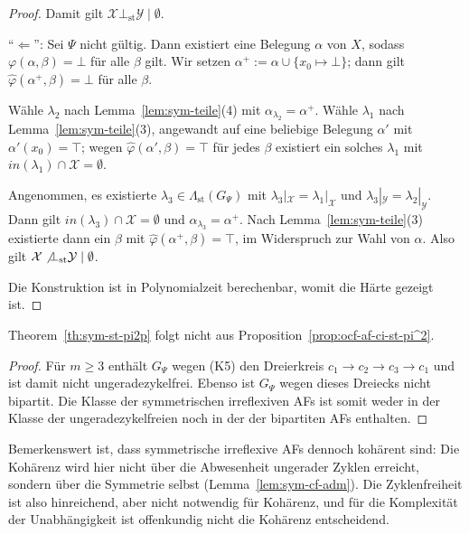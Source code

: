 \begin{proof}
    Damit gilt \(\mathcal{X}\bot_{\mathrm{st}}\mathcal{Y}\mid\emptyset\).

    \enquote{\(\Leftarrow\)}: Sei \(\Psi\) nicht gültig. Dann existiert eine
    Belegung \(\alpha\) von \(X\), sodass \(\varphi(\alpha,\beta)=\bot\) für
    alle \(\beta\) gilt. Wir setzen
    \(\alpha^{+}:=\alpha\cup\{x_0\mapsto\bot\}\); dann gilt
    \(\widehat{\varphi}(\alpha^{+},\beta)=\bot\) für alle \(\beta\).

    Wähle \(\lambda_2\) nach Lemma~\ref{lem:sym-teile}(4) mit
    \(\alpha_{\lambda_2}=\alpha^{+}\). Wähle \(\lambda_1\) nach
    Lemma~\ref{lem:sym-teile}(3), angewandt auf eine beliebige Belegung
    \(\alpha'\) mit \(\alpha'(x_0)=\top\); wegen
    \(\widehat{\varphi}(\alpha',\beta)=\top\) für jedes \(\beta\) existiert ein
    solches \(\lambda_1\) mit
    \(\mathit{in}(\lambda_1)\cap\mathcal{X}=\emptyset\).

    Angenommen, es existierte \(\lambda_3\in\Lambda_{\mathrm{st}}(G_\Psi)\) mit
    \(\lambda_3|_{\mathcal{X}}=\lambda_1|_{\mathcal{X}}\) und
    \(\lambda_3|_{\mathcal{Y}}=\lambda_2|_{\mathcal{Y}}\). Dann gilt
    \(\mathit{in}(\lambda_3)\cap\mathcal{X}=\emptyset\) und
    \(\alpha_{\lambda_3}=\alpha^{+}\). Nach Lemma~\ref{lem:sym-teile}(3)
    existierte dann ein \(\beta\) mit
    \(\widehat{\varphi}(\alpha^{+},\beta)=\top\), im Widerspruch zur Wahl von
    \(\alpha\). Also gilt
    \(\mathcal{X}\not\bot_{\mathrm{st}}\mathcal{Y}\mid\emptyset\).

    Die Konstruktion ist in Polynomialzeit berechenbar, womit die Härte gezeigt
    ist.
\end{proof}

\begin{Corollary}
    \label{cor:sym-nicht-ocf}
    Theorem~\ref{th:sym-st-pi2p} folgt nicht aus
    Proposition~\ref{prop:ocf-af-ci-st-pi^2}.
\end{Corollary}

\begin{proof}
    Für \(m\geq 3\) enthält \(G_\Psi\) wegen (K5) den Dreierkreis
    \(c_1\to c_2\to c_3\to c_1\) und ist damit nicht ungeradezykelfrei. Ebenso
    ist \(G_\Psi\) wegen dieses Dreiecks nicht bipartit. Die Klasse der
    symmetrischen irreflexiven AFs ist somit weder in der Klasse der
    ungeradezykelfreien noch in der der bipartiten AFs enthalten.
\end{proof}

Bemerkenswert ist, dass symmetrische irreflexive AFs dennoch kohärent sind: Die
Kohärenz wird hier nicht über die Abwesenheit ungerader Zyklen erreicht, sondern
über die Symmetrie selbst (Lemma~\ref{lem:sym-cf-adm}). Die Zyklenfreiheit ist
also hinreichend, aber nicht notwendig für Kohärenz, und für die Komplexität
der Unabhängigkeit ist offenkundig nicht die Kohärenz entscheidend.

